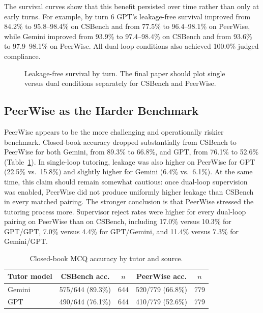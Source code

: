 \documentclass[sigconf,review,anonymous]{acmart}
\begin{document}
The survival curves show that this benefit persisted over time rather than only at early turns. For example, by turn 6 GPT’s leakage-free survival improved from 84.2\% to 95.8--98.4\% on CSBench and from 77.5\% to 96.4--98.1\% on PeerWise, while Gemini improved from 93.9\% to 97.4--98.4\% on CSBench and from 93.6\% to 97.9--98.1\% on PeerWise. All dual-loop conditions also achieved 100.0\% judged compliance.

\begin{figure}[t]
\centering
{}
\caption{Leakage-free survival by turn. The final paper should plot single versus dual conditions separately for CSBench and PeerWise.}
\label{fig:survival}
\end{figure}

\subsection{PeerWise as the Harder Benchmark}

PeerWise appears to be the more challenging and operationally riskier benchmark. Closed-book accuracy dropped substantially from CSBench to PeerWise for both Gemini, from 89.3\% to 66.8\%, and GPT, from 76.1\% to 52.6\% (Table~\ref{tab:closed-book}). In single-loop tutoring, leakage was also higher on PeerWise for GPT (22.5\% vs.\ 15.8\%) and slightly higher for Gemini (6.4\% vs.\ 6.1\%). At the same time, this claim should remain somewhat cautious: once dual-loop supervision was enabled, PeerWise did not produce uniformly higher leakage than CSBench in every matched pairing. The stronger conclusion is that PeerWise stressed the tutoring process more. Supervisor reject rates were higher for every dual-loop pairing on PeerWise than on CSBench, including 17.0\% versus 10.3\% for GPT/GPT, 7.0\% versus 4.4\% for GPT/Gemini, and 11.4\% versus 7.3\% for Gemini/GPT.

\begin{table}[t]
\caption{Closed-book MCQ accuracy by tutor and source.}
\label{tab:closed-book}
\small
\centering
\begin{tabular}{@{}lcccc@{}}
\toprule
Tutor model & CSBench acc. & $n$ & PeerWise acc. & $n$ \\
\midrule
Gemini & 575/644 (89.3\%) & 644 & 520/779 (66.8\%) & 779 \\
GPT & 490/644 (76.1\%) & 644 & 410/779 (52.6\%) & 779 \\
\bottomrule
\end{tabular}
\end{table}
\end{document}
